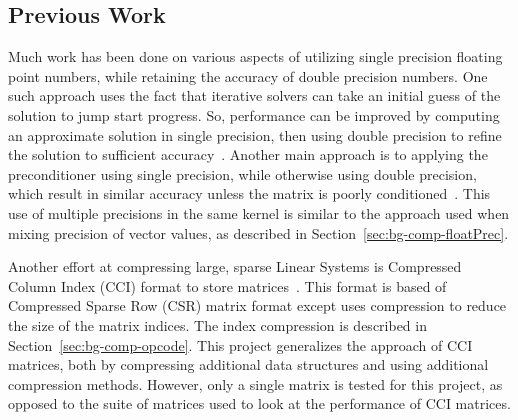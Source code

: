 \subsection{Previous Work}
Much work has been done on various aspects of utilizing single precision floating point numbers, while retaining the accuracy of double precision numbers.
One such approach uses the fact that iterative solvers can take an initial guess of the solution to jump start progress.
So, performance can be improved by computing an approximate solution in single precision, then using double precision to refine the solution to sufficient accuracy~\cite{Babolin:2008:coursePass, Buttari:2007:coursePass}.
Another main approach is to applying the preconditioner using single precision, while otherwise using double precision, which result in similar accuracy unless the matrix is poorly conditioned~\cite{Buttari:2008:mixedPrec, Hogg:2010:multiplePasses}.
This use of multiple precisions in the same kernel is similar to the approach used when mixing precision of vector values, as described in Section~\ref{sec:bg-comp-floatPrec}.

Another effort at compressing large, sparse Linear Systems is Compressed Column Index (CCI) format to store matrices~\cite{Lawlor:2013:compression}.
This format is based of Compressed Sparse Row (CSR) matrix format except uses compression to reduce the size of the matrix indices.
The index compression is described in Section~\ref{sec:bg-comp-opcode}.
This project generalizes the approach of CCI matrices, both by compressing additional data structures and using additional compression methods.
However, only a single matrix is tested for this project, as opposed to the suite of matrices used to look at the performance of CCI matrices.